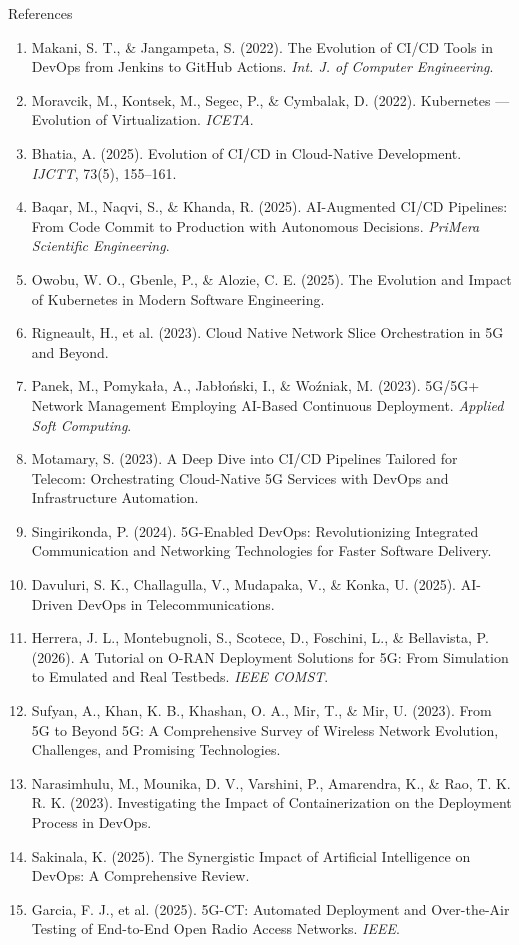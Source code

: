 \documentclass[aspectratio=169,11pt]{beamer}
\begin{document}
\begin{frame}{References}
  \tiny
  \begin{enumerate}\setlength{\itemsep}{1.4pt}
    \item Makani, S. T., \& Jangampeta, S. (2022). The Evolution of CI/CD Tools in DevOps from Jenkins to GitHub Actions. \emph{Int. J. of Computer Engineering}.
    \item Moravcik, M., Kontsek, M., Segec, P., \& Cymbalak, D. (2022). Kubernetes --- Evolution of Virtualization. \emph{ICETA}.
    \item Bhatia, A. (2025). Evolution of CI/CD in Cloud-Native Development. \emph{IJCTT}, 73(5), 155--161.
    \item Baqar, M., Naqvi, S., \& Khanda, R. (2025). AI-Augmented CI/CD Pipelines: From Code Commit to Production with Autonomous Decisions. \emph{PriMera Scientific Engineering}.
    \item Owobu, W. O., Gbenle, P., \& Alozie, C. E. (2025). The Evolution and Impact of Kubernetes in Modern Software Engineering.
    \item Rigneault, H., et al. (2023). Cloud Native Network Slice Orchestration in 5G and Beyond.
    \item Panek, M., Pomyka\l{}a, A., Jab\l{}o\'nski, I., \& Wo\'zniak, M. (2023). 5G/5G+ Network Management Employing AI-Based Continuous Deployment. \emph{Applied Soft Computing}.
    \item Motamary, S. (2023). A Deep Dive into CI/CD Pipelines Tailored for Telecom: Orchestrating Cloud-Native 5G Services with DevOps and Infrastructure Automation.
    \item Singirikonda, P. (2024). 5G-Enabled DevOps: Revolutionizing Integrated Communication and Networking Technologies for Faster Software Delivery.
    \item Davuluri, S. K., Challagulla, V., Mudapaka, V., \& Konka, U. (2025). AI-Driven DevOps in Telecommunications.
    \item Herrera, J. L., Montebugnoli, S., Scotece, D., Foschini, L., \& Bellavista, P. (2026). A Tutorial on O-RAN Deployment Solutions for 5G: From Simulation to Emulated and Real Testbeds. \emph{IEEE COMST}.
    \item Sufyan, A., Khan, K. B., Khashan, O. A., Mir, T., \& Mir, U. (2023). From 5G to Beyond 5G: A Comprehensive Survey of Wireless Network Evolution, Challenges, and Promising Technologies.
    \item Narasimhulu, M., Mounika, D. V., Varshini, P., Amarendra, K., \& Rao, T. K. R. K. (2023). Investigating the Impact of Containerization on the Deployment Process in DevOps.
    \item Sakinala, K. (2025). The Synergistic Impact of Artificial Intelligence on DevOps: A Comprehensive Review.
    \item Garcia, F. J., et al. (2025). 5G-CT: Automated Deployment and Over-the-Air Testing of End-to-End Open Radio Access Networks. \emph{IEEE}.
  \end{enumerate}
\end{frame}
\end{document}
